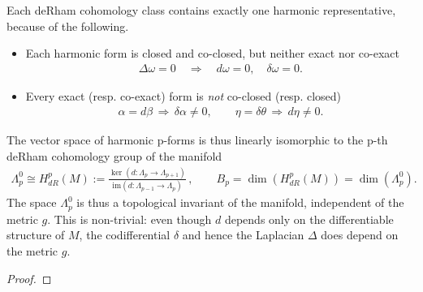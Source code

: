 \documentclass[../geometry_main.tex]{subfiles}
\begin{document}
\begin{mytheorem}
Each deRham cohomology class contains exactly one harmonic representative, because of the following.
\begin{itemize}
    \item Each harmonic form is closed and co-closed, but neither exact nor co-exact
    \begin{align}
        \Delta \omega = 0 \quad \Longrightarrow \quad d\omega = 0, \quad \delta \omega = 0.
    \end{align}
    \item Every exact (resp. co-exact) form is \emph{not} co-closed (resp. closed)
    \begin{align}
        \alpha = d\beta\,\Rightarrow\, \delta \alpha \neq 0, \qquad \eta = \delta \theta\,\Rightarrow\, d\eta \neq 0.
    \end{align}
\end{itemize} 
The vector space of harmonic p-forms is thus linearly isomorphic to the p-th deRham cohomology group of the manifold
\begin{align}
    \Lambda_p^0 \cong H^p_{dR}(M) := \frac{\ker(d:\Lambda_p\to\Lambda_{p+1})}{\mathrm{im}(d:\Lambda_{p-1}\to\Lambda_p)}\,,\qquad B_p=\dim(H^p_{dR}(M)) = \dim(\Lambda_p^0).
\end{align}
The space $\Lambda_p^0$ is thus a topological invariant of the manifold, independent of the metric \(g\).
This is non-trivial: even though $d$ depends only on the differentiable structure of $M$, the codifferential $\delta$ and hence the Laplacian $\Delta$ does depend on the metric $g$.
\end{mytheorem}
\begin{proof}
\end{proof}
\end{document}
